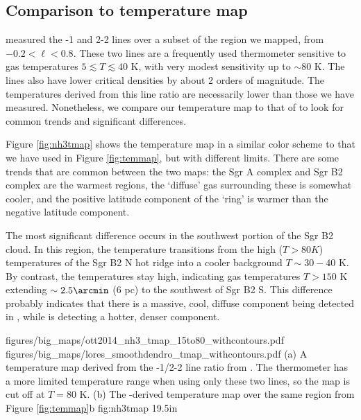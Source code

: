 \subsection{Comparison to \citet{Ott2014a} \ammonia temperature map}
\label{sec:ammoniacompare}
\citet{Ott2014a} measured the -1 and 2-2 lines over a subset of the
region we mapped, from $-0.2 < \ell < 0.8$.  These two lines are a frequently
used thermometer sensitive to gas temperatures $5 \lesssim T \lesssim 40$ K,
with very modest sensitivity up to $\sim80$ K.  The \ammonia lines also have
lower critical densities by about 2 orders of magnitude.  The temperatures
derived from this line ratio are necessarily lower than those we have measured.
Nonetheless, we compare our temperature map to that of \citet{Ott2014a} to look
for common trends and significant differences.

Figure \ref{fig:nh3tmap} shows the \citet{Ott2014a} temperature map in a
similar color scheme to that we have used in Figure \ref{fig:temmap}, but with
different limits.  There are some trends that are common between the two maps:
the Sgr A complex and Sgr B2 complex are the warmest regions, the `diffuse' gas
surrounding these is somewhat cooler, and the positive latitude component of
the \citet{Molinari2011a} `ring' is warmer than the negative latitude
component.

The most significant difference occurs in the southwest portion of the Sgr B2
cloud.  In this region, the \ammonia temperature transitions from the high
($T>80K$) temperatures of the Sgr B2 N hot ridge into a cooler background
$T\sim30-40$ K.  By contrast, the \formaldehyde temperatures stay high,
indicating gas temperatures $T>150$ K extending $\sim2.5\arcmin$ (6 pc) to the
southwest of Sgr B2 S.  This difference probably indicates that there is a
massive, cool, diffuse component being detected in \ammonia, while
\formaldehyde is detecting a hotter, denser component.

\RotFigureTwoAA
{figures/big_maps/ott2014_nh3_tmap_15to80_withcontours.pdf}
{figures/big_maps/lores_smoothdendro_tmap_withcontours.pdf}
{(a) A temperature map derived from the -1/2-2 line ratio from
\citet{Ott2014a}.  The \ammonia thermometer has a more limited temperature
range when using only these two lines, so the map is cut off at $T=80$ K.
(b) The \para-derived temperature map over the same region from Figure
\ref{fig:temmap}b
}
{fig:nh3tmap}
{1}{9.5in}

